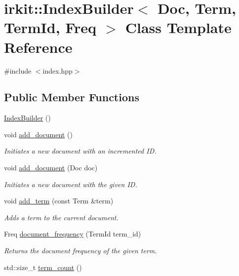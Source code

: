 \hypertarget{classirkit_1_1IndexBuilder}{}\section{irkit\+:\+:Index\+Builder$<$ Doc, Term, Term\+Id, Freq $>$ Class Template Reference}
\label{classirkit_1_1IndexBuilder}


{\ttfamily \#include $<$index.\+hpp$>$}

\subsection*{Public Member Functions}
\begin{DoxyCompactItemize}
\item 
\mbox{\hyperlink{classirkit_1_1IndexBuilder_ab56476b7728ed2618b8de7511dfe2427}{Index\+Builder}} ()
\item 
void \mbox{\hyperlink{classirkit_1_1IndexBuilder_a8a18c112d48e21a89aefa9a931a536ab}{add\+\_\+document}} ()
\begin{DoxyCompactList}\small\item\em Initiates a new document with an incremented ID. \end{DoxyCompactList}\item 
void \mbox{\hyperlink{classirkit_1_1IndexBuilder_a31b062283c9b7203ce4a65a5bd744fae}{add\+\_\+document}} (Doc doc)
\begin{DoxyCompactList}\small\item\em Initiates a new document with the given ID. \end{DoxyCompactList}\item 
void \mbox{\hyperlink{classirkit_1_1IndexBuilder_a6005b21c9a24cb54fe54957e21c0487a}{add\+\_\+term}} (const Term \&term)
\begin{DoxyCompactList}\small\item\em Adds a term to the current document. \end{DoxyCompactList}\item 
Freq \mbox{\hyperlink{classirkit_1_1IndexBuilder_ac4c8613d07637de4b67d61df2910bbd0}{document\+\_\+frequency}} (Term\+Id term\+\_\+id)
\begin{DoxyCompactList}\small\item\em Returns the document frequency of the given term. \end{DoxyCompactList}\item 
std\+::size\+\_\+t \mbox{\hyperlink{classirkit_1_1IndexBuilder_abfd5cee3ad708bd89a0a1572479ba573}{term\+\_\+count}} ()

\end{DoxyCompactItemize}
